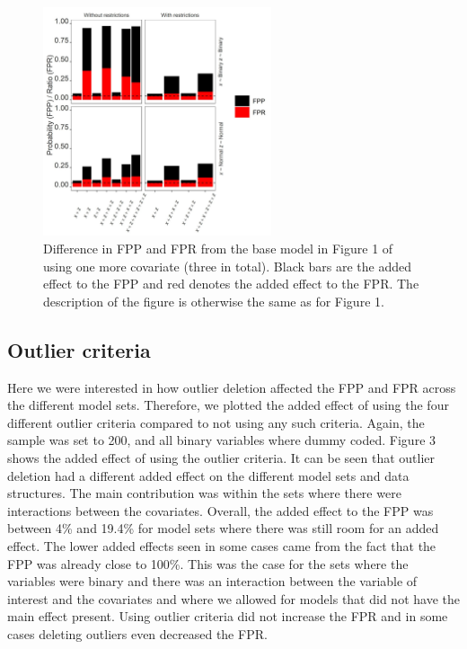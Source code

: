 \begin{figure}[hbt!]
\includegraphics[width=0.6\textwidth]{R/Analysis/Result/Figures/Figure1C.jpeg}
\centering
\caption{Difference in FPP and FPR from the base model in Figure 1 of using one more covariate (three in total). Black bars are the added effect to the FPP and red denotes the added effect to the FPR. The description of the figure is otherwise the same as for Figure 1.}
\label{fig:mainfigure}
\end{figure}

\subsection{Outlier criteria}
Here we were interested in how outlier deletion affected the FPP and FPR across the different model sets. Therefore, we plotted the added effect of using the four different outlier criteria compared to not using any such criteria. Again, the sample was set to 200, and all binary variables where dummy coded. Figure 3 shows the added effect of using the outlier criteria. It can be seen that outlier deletion had a different added effect on the different model sets and data structures. The main contribution was within the sets where there were interactions between the covariates. Overall, the added effect to the FPP was between 4\% and 19.4\% for model sets where there was still room for an added effect. The lower added effects seen in some cases came from the fact that the FPP was already close to 100\%. This was the case for the sets where the variables were binary and there was an interaction between the variable of interest and the covariates and where we allowed for models that did not have the main effect present. Using outlier criteria did not increase the FPR and in some cases deleting outliers even decreased the FPR. 

